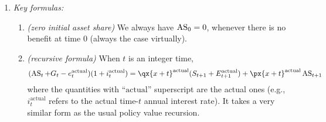 \begin{enumerate}

\item \emph{Key formulas:}
\begin{enumerate}
\item \emph{(zero initial asset share)} We always have \(\operatorname{AS}_{0}=0\), whenever
there is no benefit at time \(0\) (always the case virtually).

\item \label{it:asset-share-recurs} \emph{(recursive formula)} When \(t\) is an
integer time,
\[
(\as_{t}+G_t-e_t^{\mathrm{actual}})(1+i^{\mathrm{actual}}_t)
=\qx{x+t}^{\mathrm{actual}}(S_{t+1}+E_{t+1}^{\mathrm{actual}})
+\px{x+t}^{\mathrm{actual}}\as_{t+1}
\]
where the quantities with ``\(\mathrm{actual}\)'' superscript are the actual
ones (e.g., \(i_t^{\mathrm{actual}}\) refers to the actual time-\(t\) annual
interest rate). It takes a very similar form as the usual policy value
recursion.
\end{enumerate}
\end{enumerate}
